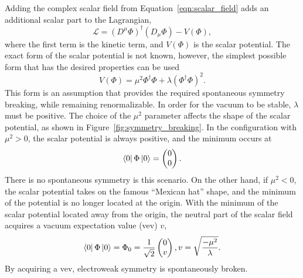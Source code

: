 Adding the complex scalar field from Equation~\ref{eqn:scalar_field} adds an
additional scalar part to the Lagrangian,
\begin{equation}
  \mathcal{L} =
  \left(D^{\mu}\Phi\right)^{\dagger}\left(D_{\mu}\Phi\right) - V(\Phi),
  \label{eqn:scalar_lagrangian}
\end{equation}
where the first term is the kinetic term, and $V(\Phi)$ is the scalar
potential.
The exact form of the scalar potential is not known, however, the simplest
possible form that has the desired properties can be used
\begin{equation}
  V(\Phi) = \mu^2 \Phi^{\dagger}\Phi + \lambda\left(\Phi^{\dagger}\Phi\right)^2.
\end{equation}
This form is an assumption that provides the required spontaneous symmetry
breaking, while remaining renormalizable.
In order for the vacuum to be stable, $\lambda$ must be positive.
The choice of the $\mu^2$ parameter affects the shape of the scalar potential,
as shown in Figure~\ref{fig:symmetry_breaking}.
In the configuration with $\mu^2 > 0$, the scalar potential is always positive,
and the minimum occurs at
\begin{equation}
  \bra{0} \Phi \ket{0} = \begin{pmatrix} 0 \\ 0 \end{pmatrix}.
\end{equation}
There is no spontaneous symmetry is this scenario.
On the other hand, if $\mu^2 < 0$, the scalar potential takes on the famous
``Mexican hat'' shape, and the minimum of the potential is no longer located at
the origin.
With the minimum of the scalar potential located away from the origin, the
neutral part of the scalar field acquires a vacuum expectation value (vev) $v$,
\begin{equation}
  \bra{0} \Phi \ket{0} =
  \Phi_0 =
  \frac{1}{\sqrt{2}} \begin{pmatrix} 0 \\ v \end{pmatrix},
  v = \sqrt{\frac{-\mu^2}{\lambda}}.
\end{equation}
By acquiring a vev, electroweak symmetry is spontaneously broken.

